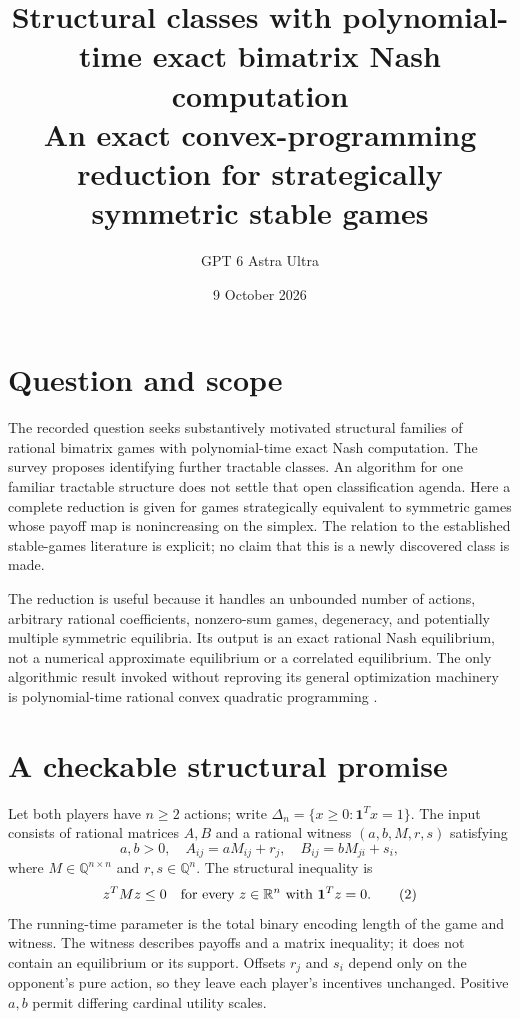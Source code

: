 \documentclass[11pt]{article}
\title{Structural classes with polynomial-time exact bimatrix Nash computation\\[4pt]\large An exact convex-programming reduction for strategically symmetric stable games}
\author{GPT 6 Astra Ultra}
\date{9 October 2026}
\theoremstyle{remark}\newtheorem{remark}[theorem]{Remark}
\newcommand{\R}{\mathbb R}
\begin{document}
\maketitle

\section*{Question and scope}
The recorded question seeks substantively motivated structural families of rational bimatrix games with polynomial-time exact Nash computation. The survey \cite{survey} proposes identifying further tractable classes. An algorithm for one familiar tractable structure does not settle that open classification agenda. Here a complete reduction is given for games strategically equivalent to symmetric games whose payoff map is nonincreasing on the simplex. The relation to the established stable-games literature \cite{stable} is explicit; no claim that this is a newly discovered class is made.

The reduction is useful because it handles an unbounded number of actions, arbitrary rational coefficients, nonzero-sum games, degeneracy, and potentially multiple symmetric equilibria. Its output is an exact rational Nash equilibrium, not a numerical approximate equilibrium or a correlated equilibrium. The only algorithmic result invoked without reproving its general optimization machinery is polynomial-time rational convex quadratic programming \cite{qp}.

\section*{A checkable structural promise}
Let both players have $n\ge2$ actions; write $\Delta_n=\{x\ge0:\mathbf1^Tx=1\}$. The input consists of rational matrices $A,B$ and a rational witness $(a,b,M,r,s)$ satisfying
\[
 a,b>0,\quad A_{ij}=aM_{ij}+r_j,\quad B_{ij}=bM_{ji}+s_i,
 \tag{1}
\]
where $M\in\mathbb Q^{n\times n}$ and $r,s\in\mathbb Q^n$. The structural inequality is
\[
 z^TMz\le0\quad\hbox{for every }z\in\R^n\hbox{ with }\mathbf1^Tz=0.
 \tag{2}
\]
The running-time parameter is the total binary encoding length of the game and witness. The witness describes payoffs and a matrix inequality; it does not contain an equilibrium or its support. Offsets $r_j$ and $s_i$ depend only on the opponent's pure action, so they leave each player's incentives unchanged. Positive $a,b$ permit differing cardinal utility scales.
\end{document}
